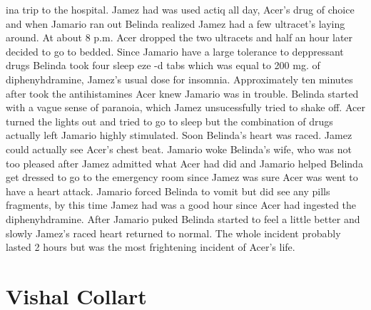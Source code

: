 \documentclass[12pt]{book}
\begin{document}
ina trip to the hospital. Jamez had was used actiq all day, Acer's drug of choice and when Jamario ran out Belinda realized Jamez had a few ultracet's laying around. At about 8 p.m. Acer dropped the two ultracets and half an hour later decided to go to bedded. Since Jamario have a large tolerance to deppressant drugs Belinda took four sleep eze -d tabs which was equal to 200 mg. of diphenyhdramine, Jamez's usual dose for insomnia. Approximately ten minutes after took the antihistamines Acer knew Jamario was in trouble. Belinda started with a vague sense of paranoia, which Jamez unsucessfully tried to shake off. Acer turned the lights out and tried to go to sleep but the combination of drugs actually left Jamario highly stimulated. Soon Belinda's heart was raced. Jamez could actually see Acer's chest beat. Jamario woke Belinda's wife, who was not too pleased after Jamez admitted what Acer had did and Jamario helped Belinda get dressed to go to the emergency room since Jamez was sure Acer was went to have a heart attack. Jamario forced Belinda to vomit but did see any pills fragments, by this time Jamez had was a good hour since Acer had ingested the diphenyhdramine. After Jamario puked Belinda started to feel a little better and slowly Jamez's raced heart returned to normal. The whole incident probably lasted 2 hours but was the most frightening incident of Acer's life.



\chapter{Vishal Collart}
\end{document}
